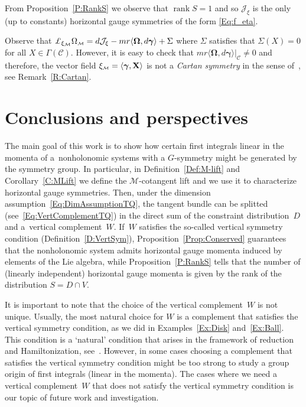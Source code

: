 \documentclass[pdftex]{sigma}
\numberwithin{equation}{section}
\def\M{\mathcal{M}}
\def\J{\mathcal{J}}
\def\C{\mathcal{C}}
\def\subM{{\mbox{\tiny{$\M$}}}}
\def\vecOm{\boldsymbol{\Omega}}
\def\vecgamma{\boldsymbol{\gamma}}
\begin{document}
From Proposition~\ref{P:RankS} we observe that $\operatorname{rank}S =1$ and so $\J_\xi$ is the only (up to constants) horizontal gauge symmetries of the form \eqref{Eq:f_eta}.

\begin{Remark} Observe that $\pounds_{\xi_\subM} \Omega_\subM = d\J_\xi - mr\langle \vecOm, d\vecgamma\rangle + \Sigma$ where $\Sigma$ satisf\/ies that $\Sigma (X) = 0$ for all $X\in \Gamma(\C)$. However, it is easy to check that $mr\langle \vecOm, d\vecgamma\rangle |_\C \neq 0 $ and therefore, the vector f\/ield $\xi_\subM = \langle \vecgamma, {\bf X} \rangle$ is not a {\it Cartan symmetry} in the sense of~\cite{Crampin-Mestdag}, see Remark~\ref{R:Cartan}.
\end{Remark}

\section{Conclusions and perspectives}
The main goal of this work is to show how certain f\/irst integrals linear in the momenta of a~nonholonomic systems with a $G$-symmetry might be generated by the symmetry group.
In particular, in Def\/inition~\ref{Def:M-lift} and Corollary~\ref{C:MLift} we def\/ine the $\M$-cotangent lift and we use it to characterize
horizontal gauge symmetries.
Then, under the dimension assumption~\eqref{Eq:DimAssumptionTQ}, the tangent
bundle can be splitted (see~\eqref{Eq:VertComplementTQ})
in the direct sum of the constraint distribution~$D$ and a~vertical complement~$W$.
If~$W$ satisf\/ies the so-called vertical symmetry condition (Def\/inition~\ref{D:VertSym}),
Proposition~\ref{Prop:Conserved} guarantees  that the nonholonomic system admits
horizontal gauge momenta induced by elements of the Lie algebra, while
Proposition~\ref{P:RankS} tells that the number of (linearly independent)
horizontal gauge momenta is given by the rank of the distribution $S=D\cap V$.

It is important to note that the choice of the vertical complement~$W$ is not unique.
Usually, the most natural choice for $W$ is a complement that satisf\/ies the vertical
symmetry condition, as we did in Examples~\ref{Ex:Disk} and~\ref{Ex:Ball}. This condition
is a `natural' condition that arises in the framework of reduction and Hamiltonization,
see~\cite{Paula}.  However, in some cases choosing a complement that satisf\/ies
the vertical symmetry condition might be too strong to study a group origin
of f\/irst integrals (linear in the momenta).  The cases where we need a vertical
complement~$W$ that does not satisfy the vertical symmetry condition is our
topic of future work and investigation.
\end{document}
